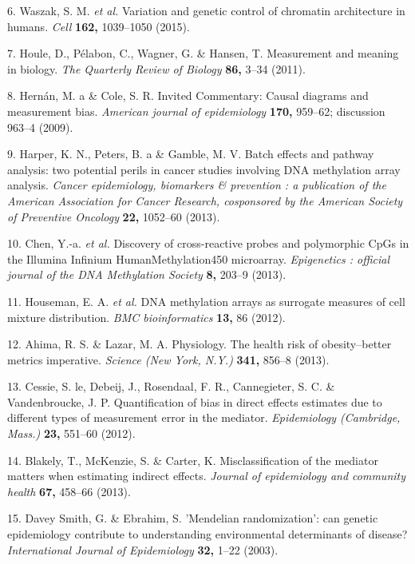 \documentclass[]{article}
\begin{document}
\hypertarget{ref-Waszak2015}{}
6. Waszak, S. M. \emph{et al.} Variation and genetic control of
chromatin architecture in humans. \emph{Cell} \textbf{162,} 1039--1050
(2015).

\hypertarget{ref-Houle2011}{}
7. Houle, D., Pélabon, C., Wagner, G. \& Hansen, T. Measurement and
meaning in biology. \emph{The Quarterly Review of Biology} \textbf{86,}
3--34 (2011).

\hypertarget{ref-Hernan2009}{}
8. Hernán, M. a \& Cole, S. R. Invited Commentary: Causal diagrams and
measurement bias. \emph{American journal of epidemiology} \textbf{170,}
959--62; discussion 963--4 (2009).

\hypertarget{ref-Harper2013}{}
9. Harper, K. N., Peters, B. a \& Gamble, M. V. Batch effects and
pathway analysis: two potential perils in cancer studies involving DNA
methylation array analysis. \emph{Cancer epidemiology, biomarkers \&
prevention : a publication of the American Association for Cancer
Research, cosponsored by the American Society of Preventive Oncology}
\textbf{22,} 1052--60 (2013).

\hypertarget{ref-Chen2013a}{}
10. Chen, Y.-a. \emph{et al.} Discovery of cross-reactive probes and
polymorphic CpGs in the Illumina Infinium HumanMethylation450
microarray. \emph{Epigenetics : official journal of the DNA Methylation
Society} \textbf{8,} 203--9 (2013).

\hypertarget{ref-Houseman2012}{}
11. Houseman, E. A. \emph{et al.} DNA methylation arrays as surrogate
measures of cell mixture distribution. \emph{BMC bioinformatics}
\textbf{13,} 86 (2012).

\hypertarget{ref-Ahima2013}{}
12. Ahima, R. S. \& Lazar, M. A. Physiology. The health risk of
obesity--better metrics imperative. \emph{Science (New York, N.Y.)}
\textbf{341,} 856--8 (2013).

\hypertarget{ref-LeCessie2012}{}
13. Cessie, S. le, Debeij, J., Rosendaal, F. R., Cannegieter, S. C. \&
Vandenbroucke, J. P. Quantification of bias in direct effects estimates
due to different types of measurement error in the mediator.
\emph{Epidemiology (Cambridge, Mass.)} \textbf{23,} 551--60 (2012).

\hypertarget{ref-Blakely2013}{}
14. Blakely, T., McKenzie, S. \& Carter, K. Misclassification of the
mediator matters when estimating indirect effects. \emph{Journal of
epidemiology and community health} \textbf{67,} 458--66 (2013).

\hypertarget{ref-DaveySmith2003}{}
15. Davey Smith, G. \& Ebrahim, S. 'Mendelian randomization': can
genetic epidemiology contribute to understanding environmental
determinants of disease? \emph{International Journal of Epidemiology}
\textbf{32,} 1--22 (2003).
\end{document}
